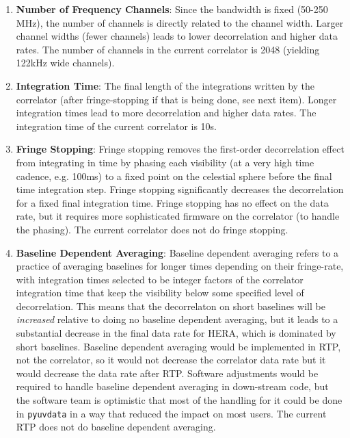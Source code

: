 \documentclass{article}
\begin{document}
\begin{enumerate}
\item \textbf{Number of Frequency Channels}: Since the bandwidth is fixed (50-250 MHz), the number of channels is directly related to the channel width. Larger channel widths (fewer channels) leads to lower decorrelation and higher data rates. The number of channels in the current correlator is 2048 (yielding 122kHz wide channels).
\item \textbf{Integration Time}: The final length of the integrations written by the correlator (after fringe-stopping if that is being done, see next item). Longer integration times lead to more decorrelation and higher data rates. The integration time of the current correlator is 10s.
\item \textbf{Fringe Stopping}: Fringe stopping removes the first-order decorrelation effect from integrating in time by phasing each visibility (at a very high time cadence, e.g. 100ms) to a fixed point on the celestial sphere before the final time integration step. Fringe stopping significantly decreases the decorrelation for a fixed final integration time. Fringe stopping has no effect on the data rate, but it requires more sophisticated firmware on the correlator (to handle the phasing). The current correlator does not do fringe stopping.
\item \textbf{Baseline Dependent Averaging}: Baseline dependent averaging refers to a practice of averaging baselines for longer times depending on their fringe-rate, with integration times selected to be integer factors of the correlator integration time that keep the visibility below some specified level of decorrelation. This means that the decorrelaton on short baselines will be \textit{increased} relative to doing no baseline dependent averaging, but it leads to a substantial decrease in the final data rate for HERA, which is dominated by short baselines. Baseline dependent averaging would be implemented in RTP, not the correlator, so it would not decrease the correlator data rate but it would decrease the data rate after RTP. Software adjustments would be required to handle baseline dependent averaging in down-stream code, but the software team is optimistic that most of the handling for it could be done in \texttt{pyuvdata} in a way that reduced the impact on most users. The current RTP does not do baseline dependent averaging.
\end{enumerate}
\end{document}
